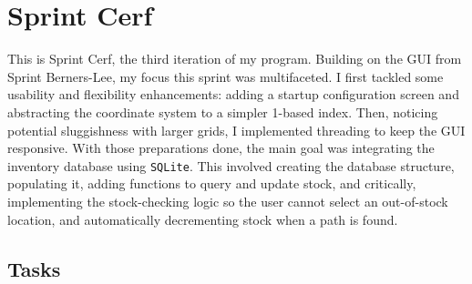 \newpage

\section{Sprint Cerf}

This is Sprint Cerf, the third iteration of my program. Building on the GUI from Sprint Berners-Lee, my focus this sprint was multifaceted. I first tackled some usability and flexibility enhancements: adding a startup configuration screen and abstracting the coordinate system to a simpler 1-based index. Then, noticing potential sluggishness with larger grids, I implemented threading to keep the GUI responsive. With those preparations done, the main goal was integrating the inventory database using \verb|SQLite|. This involved creating the database structure, populating it, adding functions to query and update stock, and critically, implementing the stock-checking logic so the user cannot select an out-of-stock location, and automatically decrementing stock when a path is found.

\subsection{Tasks}

